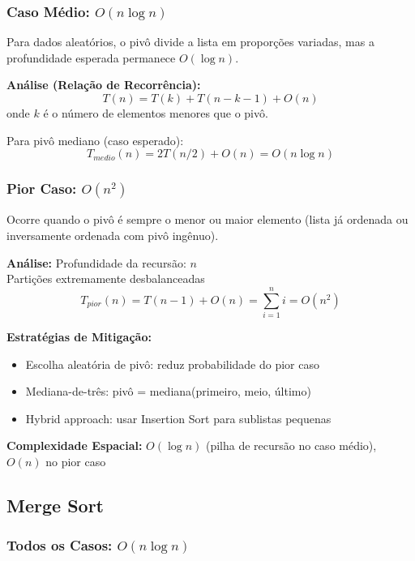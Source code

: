 \documentclass[conference]{IEEEtran}
\begin{document}
\subsubsection{Caso Médio: $O(n \log n)$}

Para dados aleatórios, o pivô divide a lista em proporções variadas, mas a profundidade esperada permanece $O(\log n)$.

\textbf{Análise (Relação de Recorrência):}
\begin{equation}
T(n) = T(k) + T(n-k-1) + O(n)
\end{equation}
onde $k$ é o número de elementos menores que o pivô.

Para pivô mediano (caso esperado):
\begin{equation}
T_{medio}(n) = 2T(n/2) + O(n) = O(n \log n)
\end{equation}

\subsubsection{Pior Caso: $O(n^2)$}

Ocorre quando o pivô é sempre o menor ou maior elemento (lista já ordenada ou inversamente ordenada com pivô ingênuo).

\textbf{Análise:}
Profundidade da recursão: $n$\\
Partições extremamente desbalanceadas
\begin{equation}
T_{pior}(n) = T(n-1) + O(n) = \sum_{i=1}^{n} i = O(n^2)
\end{equation}

\textbf{Estratégias de Mitigação:}
\begin{itemize}
    \item Escolha aleatória de pivô: reduz probabilidade do pior caso
    \item Mediana-de-três: pivô = mediana(primeiro, meio, último)
    \item Hybrid approach: usar Insertion Sort para sublistas pequenas
\end{itemize}

\textbf{Complexidade Espacial:} $O(\log n)$ (pilha de recursão no caso médio), $O(n)$ no pior caso

\subsection{Merge Sort}

\subsubsection{Todos os Casos: $O(n \log n)$}
\end{document}
